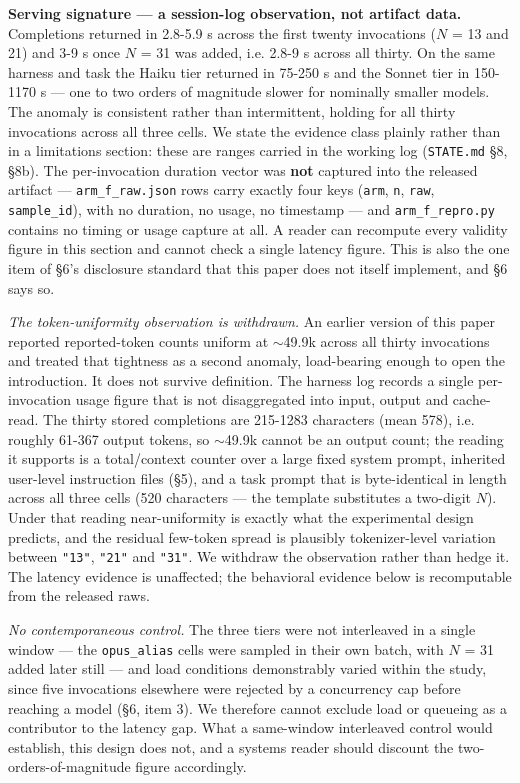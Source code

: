 \documentclass[11pt]{article}
\begin{document}
\textbf{Serving signature --- a session-log observation, not artifact data.} Completions
returned in 2.8-5.9 s across the first twenty invocations ($N$ = 13 and 21) and 3-9 s once
$N$ = 31 was added, i.e. 2.8-9 s across all thirty. On the same harness and task the Haiku
tier returned in 75-250 s and the Sonnet tier in 150-1170 s --- one to two orders of
magnitude slower for nominally smaller models. The anomaly is consistent rather than
intermittent, holding for all thirty invocations across all three cells. We state the
evidence class plainly rather than in a limitations section: these are ranges carried in
the working log (\texttt{STATE.md} \S8, \S8b). The per-invocation duration vector was \textbf{not}
captured into the released artifact --- \texttt{arm\_f\_raw.json} rows carry exactly four keys
(\texttt{arm}, \texttt{n}, \texttt{raw}, \texttt{sample\_id}), with no duration, no usage, no timestamp --- and
\texttt{arm\_f\_repro.py} contains no timing or usage capture at all. A reader can recompute every
validity figure in this section and cannot check a single latency figure. This is also the
one item of \S6's disclosure standard that this paper does not itself implement, and \S6
says so.

\emph{The token-uniformity observation is withdrawn.} An earlier version of this paper reported
reported-token counts uniform at $\sim$49.9k across all thirty invocations and treated that
tightness as a second anomaly, load-bearing enough to open the introduction. It does not
survive definition. The harness log records a single per-invocation usage figure that is
not disaggregated into input, output and cache-read. The thirty stored completions are
215-1283 characters (mean 578), i.e. roughly 61-367 output tokens, so $\sim$49.9k cannot be an
output count; the reading it supports is a total/context counter over a large fixed system
prompt, inherited user-level instruction files (\S5), and a task prompt that is
byte-identical in length across all three cells (520 characters --- the template substitutes
a two-digit $N$). Under that reading near-uniformity is exactly what the experimental design
predicts, and the residual few-token spread is plausibly tokenizer-level variation between
\texttt{"13"}, \texttt{"21"} and \texttt{"31"}. We withdraw the observation rather than hedge it. The latency
evidence is unaffected; the behavioral evidence below is recomputable from the released
raws.

\emph{No contemporaneous control.} The three tiers were not interleaved in a single window ---
the \texttt{opus\_alias} cells were sampled in their own batch, with $N$ = 31 added later still ---
and load conditions demonstrably varied within the study, since five invocations elsewhere
were rejected by a concurrency cap before reaching a model (\S6, item 3). We therefore
cannot exclude load or queueing as a contributor to the latency gap. What a same-window
interleaved control would establish, this design does not, and a systems reader should
discount the two-orders-of-magnitude figure accordingly.
\end{document}
